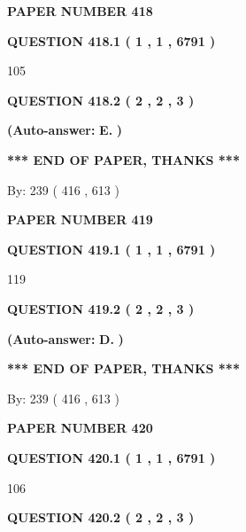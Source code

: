 \documentclass{ctexart}
\begin{document}
   
\newpage 
\setcounter{page}{ 
   418001 } 
   
   
 {\textbf{ \Large{ PAPER NUMBER  418  }}}
   
   
   
   
  
  
{\textbf{\large{QUESTION
418.1 
 ( 1 , 1 , 6791 )
}}}

105
  
  
{\textbf{\large{QUESTION
418.2 
 ( 2 , 2 , 3 )
}}}
 
 
{\textbf{(Auto-answer:}}
{\textbf{\large{
E.}}}
{\textbf{)}}
 
 
   
   
   
   
\vspace{1.0in} 
{\textbf{\large{ *** END OF PAPER, THANKS *** }}} 
   
   
\hspace{1.0in} By: 
 239 ( 416 ,  613 )
   
   
   
   
\newpage 
\setcounter{page}{ 
   419001 } 
   
   
 {\textbf{ \Large{ PAPER NUMBER  419  }}}
   
   
   
   
  
  
{\textbf{\large{QUESTION
419.1 
 ( 1 , 1 , 6791 )
}}}

119
  
  
{\textbf{\large{QUESTION
419.2 
 ( 2 , 2 , 3 )
}}}
 
 
{\textbf{(Auto-answer:}}
{\textbf{\large{
D.}}}
{\textbf{)}}
 
 
   
   
   
   
\vspace{1.0in} 
{\textbf{\large{ *** END OF PAPER, THANKS *** }}} 
   
   
\hspace{1.0in} By: 
 239 ( 416 ,  613 )
   
   
   
   
\newpage 
\setcounter{page}{ 
   420001 } 
   
   
 {\textbf{ \Large{ PAPER NUMBER  420  }}}
   
   
   
   
  
  
{\textbf{\large{QUESTION
420.1 
 ( 1 , 1 , 6791 )
}}}

106
  
  
{\textbf{\large{QUESTION
420.2 
 ( 2 , 2 , 3 )
}}}
 
\end{document}
